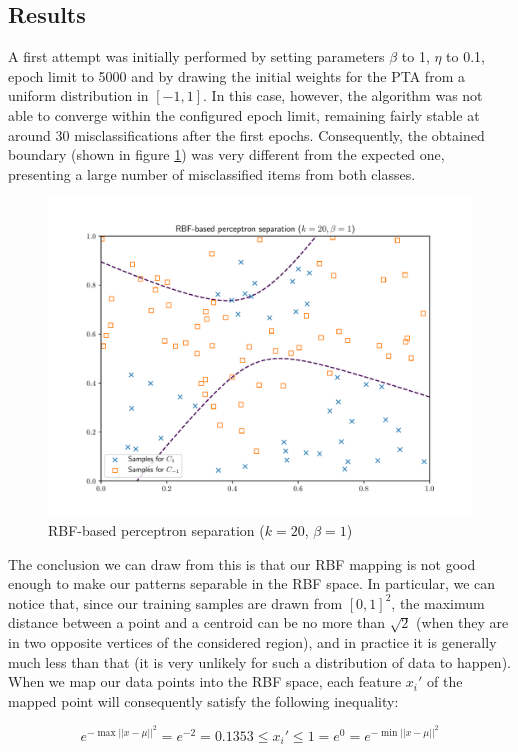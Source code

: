 \documentclass[letterpaper,headings=standardclasses]{scrartcl}
\begin{document}
\subsection{Results}

A first attempt was initially performed by setting parameters $\beta$ to 1, $\eta$ to 0.1, epoch limit to 5000 and by drawing the initial weights for the PTA from a uniform distribution in $[-1, 1]$. In this case, however, the algorithm was not able to converge within the configured epoch limit, remaining fairly stable at around 30 misclassifications after the first epochs. Consequently, the obtained boundary (shown in figure \ref{sep_20_1}) was very different from the expected one, presenting a large number of misclassified items from both classes.

\begin{figure}[h]
    \centering
    \includegraphics[width=0.7\linewidth]{sep_20_1.pdf}
    \caption{RBF-based perceptron separation ($k = 20$, $\beta = 1$)}
    \label{sep_20_1}
\end{figure}

The conclusion we can draw from this is that our RBF mapping is not good enough to make our patterns separable in the RBF space. In particular, we can notice that, since our training samples are drawn from $[0,1]^2$, the maximum distance between a point and a centroid can be no more than $\sqrt{2}$ (when they are in two opposite vertices of the considered region), and in practice it is generally much less than that (it is very unlikely for such a distribution of data to happen). When we map our data points into the RBF space, each feature $x_i'$ of the mapped point will consequently satisfy the following inequality:

$$ e^{-\max{||x - \mu||^2}} = e^{-2} = 0.1353 \le x_i' \le 1 = e^{0} = e^{-\min{||x - \mu||^2}} $$
\end{document}
